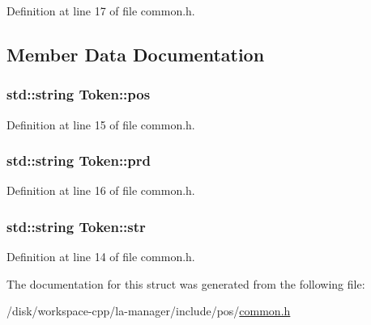 Definition at line 17 of file common.h.

\subsection{Member Data Documentation}
\hypertarget{structToken_d0d56a715af7f550150d1e4503fd3f2b}{
\subsubsection[{pos}]{\setlength{\rightskip}{0pt plus 5cm}std::string {\bf Token::pos}}}
\label{structToken_d0d56a715af7f550150d1e4503fd3f2b}




Definition at line 15 of file common.h.\hypertarget{structToken_54f6054cbf612920cdf0ab80fee569cb}{
\subsubsection[{prd}]{\setlength{\rightskip}{0pt plus 5cm}std::string {\bf Token::prd}}}
\label{structToken_54f6054cbf612920cdf0ab80fee569cb}




Definition at line 16 of file common.h.\hypertarget{structToken_2b94b0c16e50e8a7db896fa3f26472a8}{
\subsubsection[{str}]{\setlength{\rightskip}{0pt plus 5cm}std::string {\bf Token::str}}}
\label{structToken_2b94b0c16e50e8a7db896fa3f26472a8}




Definition at line 14 of file common.h.

The documentation for this struct was generated from the following file:\begin{CompactItemize}
\item 
/disk/workspace-cpp/la-manager/include/pos/\hyperlink{common_8h}{common.h}\end{CompactItemize}
